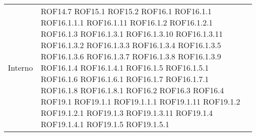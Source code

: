\begin{longtable}{p{2.5cm}!{\VRule[1pt]}p{2.5cm}}
	Interno & ROF14.7 \newline ROF15.1 \newline ROF15.2 \newline ROF16.1 \newline ROF16.1.1 \newline ROF16.1.1.1 \newline ROF16.1.11 \newline ROF16.1.2 \newline ROF16.1.2.1 \newline ROF16.1.3 \newline ROF16.1.3.1 \newline ROF16.1.3.10 \newline ROF16.1.3.11 \newline ROF16.1.3.2 \newline ROF16.1.3.3 \newline ROF16.1.3.4 \newline ROF16.1.3.5 \newline ROF16.1.3.6 \newline ROF16.1.3.7 \newline ROF16.1.3.8 \newline ROF16.1.3.9 \newline ROF16.1.4 \newline ROF16.1.4.1 \newline ROF16.1.5 \newline ROF16.1.5.1 \newline ROF16.1.6 \newline ROF16.1.6.1 \newline ROF16.1.7 \newline ROF16.1.7.1 \newline ROF16.1.8 \newline ROF16.1.8.1 \newline ROF16.2 \newline ROF16.3 \newline ROF16.4 \newline ROF19.1 \newline ROF19.1.1 \newline ROF19.1.1.1 \newline ROF19.1.11 \newline ROF19.1.2 \newline ROF19.1.2.1 \newline ROF19.1.3 \newline ROF19.1.3.11 \newline ROF19.1.4 \newline ROF19.1.4.1 \newline ROF19.1.5 \newline ROF19.1.5.1 \\

\end{longtable}
